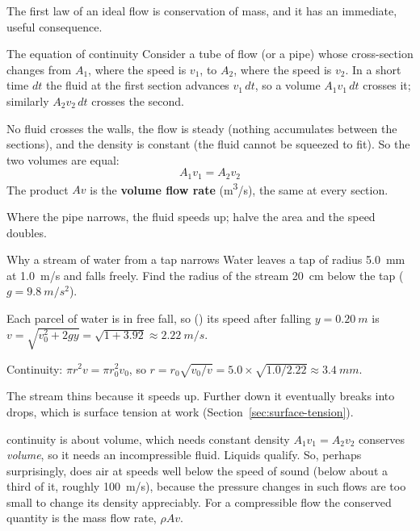 The first law of an ideal flow is conservation of mass, and it has an immediate, useful consequence.

\begin{derivbox}{The equation of continuity}
 Consider a tube of flow (or a pipe) whose cross-section changes from $A_1$, where the speed is $v_1$,
to $A_2$, where the speed is $v_2$. In a short time $dt$ the fluid at the first section advances
$v_1\,dt$, so a volume $A_1v_1\,dt$ crosses it; similarly $A_2v_2\,dt$ crosses the second.

 No fluid crosses the walls, the flow is steady (nothing accumulates between the sections), and
the density is constant (the fluid cannot be squeezed to fit). So the two volumes are equal:
\[
\boxed{\;A_1v_1=A_2v_2\;}
\]
The product $Av$ is the \textbf{volume flow rate} (\si{m^3/s}), the same at every section.

 Where the pipe narrows, the fluid speeds up; halve the area and the speed doubles.
\end{derivbox}


\begin{exbox}{Why a stream of water from a tap narrows}\label{ex:fluids-tap}
Water leaves a tap of radius \SI{5.0}{mm} at \SI{1.0}{m/s} and falls freely. Find the radius of the stream
\SI{20}{cm} below the tap ($g=\SI{9.8}{m/s^2}$).

 Each parcel of water is in free fall, so () its speed after falling
$y=\SI{0.20}{m}$ is $v=\sqrt{v_0^2+2gy}=\sqrt{1+3.92}\approx\SI{2.22}{m/s}$.

 Continuity: $\pi r^2v=\pi r_0^2v_0$, so
$r=r_0\sqrt{v_0/v}=5.0\times\sqrt{1.0/2.22}\approx\SI{3.4}{mm}$.

\medskip
The stream thins because it speeds up. Further down it eventually breaks into drops, which is surface
tension at work (Section~\ref{sec:surface-tension}). 
\end{exbox}

\begin{trapbox}{continuity is about volume, which needs constant density}
$A_1v_1=A_2v_2$ conserves \emph{volume}, so it needs an incompressible fluid. Liquids qualify. So, perhaps
surprisingly, does air at speeds well below the speed of sound (below about a third of it, roughly
\SI{100}{m/s}), because the pressure changes in such flows are too small to change its density appreciably.
For a compressible flow the conserved quantity is the mass flow rate, $\rho Av$.
\end{trapbox}

